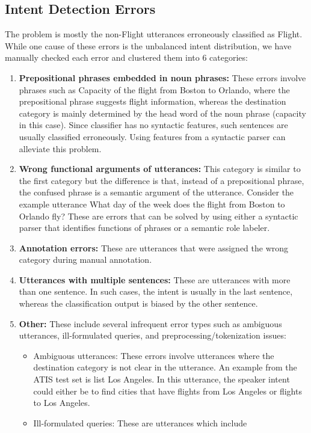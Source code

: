\subsection{Intent Detection Errors}
The problem is mostly the non-Flight utterances erroneously classified as Flight. While one cause of these errors is the unbalanced intent distribution, we have manually checked
each error and clustered them into 6 categories:
\begin{enumerate}
\item \textbf{Prepositional phrases embedded in noun phrases:} These errors
involve phrases such as Capacity of the flight from Boston
to Orlando, where the prepositional phrase suggests flight information,
whereas the destination category is mainly determined
by the head word of the noun phrase (capacity in this
case). Since classifier has no syntactic features, such sentences
are usually classified erroneously. Using features from
a syntactic parser can alleviate this problem.
\item \textbf{Wrong functional arguments of utterances:} This category is
similar to the first category but the difference is that, instead
of a prepositional phrase, the confused phrase is a semantic
argument of the utterance. Consider the example utterance
What day of the week does the flight from Boston to Orlando
fly? These are errors that can be solved by using either a syntactic
parser that identifies functions of phrases or a semantic
role labeler.
\item \textbf{Annotation errors: }These are utterances that were assigned
the wrong category during manual annotation.
\item \textbf{Utterances with multiple sentences: }These are utterances with
more than one sentence. In such cases, the intent is usually in
the last sentence, whereas the classification output is biased
by the other sentence.
\item \textbf{Other:} These include several infrequent error types such as
ambiguous utterances, ill-formulated queries, and preprocessing/tokenization
issues:
\begin{itemize}
\item Ambiguous utterances: These errors involve utterances
where the destination category is not clear in the utterance.
An example from the ATIS test set is list Los
Angeles. In this utterance, the speaker intent could either
be to find cities that have flights from Los Angeles
or flights to Los Angeles.
\item Ill-formulated queries: These are utterances which include

\end{itemize}
\end{enumerate}
